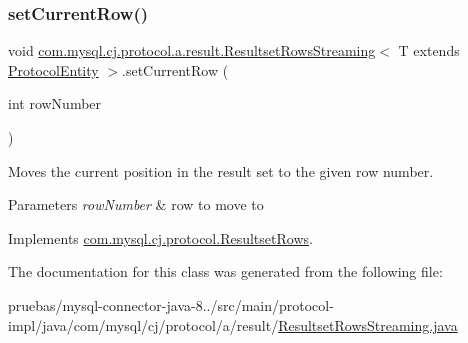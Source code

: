 \mbox{\label{classcom_1_1mysql_1_1cj_1_1protocol_1_1a_1_1result_1_1_resultset_rows_streaming_ac2448082c41dad09ccd418eaf3f400e0}} 
\subsubsection{\texorpdfstring{set\+Current\+Row()}{setCurrentRow()}}
{\footnotesize\ttfamily void \mbox{\hyperlink{classcom_1_1mysql_1_1cj_1_1protocol_1_1a_1_1result_1_1_resultset_rows_streaming}{com.\+mysql.\+cj.\+protocol.\+a.\+result.\+Resultset\+Rows\+Streaming}}$<$ T extends \mbox{\hyperlink{interfacecom_1_1mysql_1_1cj_1_1protocol_1_1_protocol_entity}{Protocol\+Entity}} $>$.set\+Current\+Row (\begin{DoxyParamCaption}\item[{int}]{row\+Number }\end{DoxyParamCaption})}

Moves the current position in the result set to the given row number.


\begin{DoxyParams}{Parameters}
{\em row\+Number} & row to move to \\
\hline
\end{DoxyParams}


Implements \mbox{\hyperlink{interfacecom_1_1mysql_1_1cj_1_1protocol_1_1_resultset_rows_a813efe790e18424a02b692a3f9213446}{com.\+mysql.\+cj.\+protocol.\+Resultset\+Rows}}.



The documentation for this class was generated from the following file\+:\begin{DoxyCompactItemize}
\item 
pruebas/mysql-\/connector-\/java-\/8../src/main/protocol-\/impl/java/com/mysql/cj/protocol/a/result/\mbox{\hyperlink{_resultset_rows_streaming_8java}{Resultset\+Rows\+Streaming.\+java}}\end{DoxyCompactItemize}
